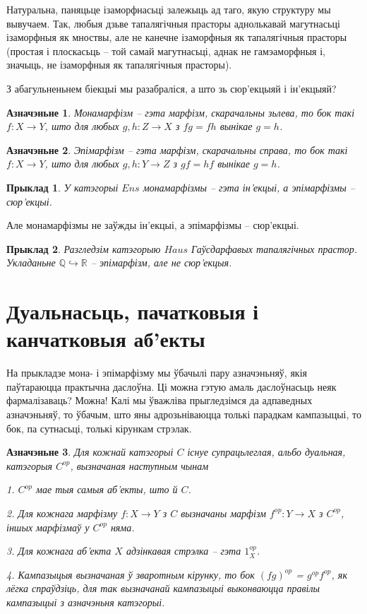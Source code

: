 \documentclass[a4paper,12pt]{book}
\newtheorem{example}{Прыклад}[section]
\newtheorem{definition}{Азначэньне}[section]
\begin{document}
Натуральна, паняцьце ізаморфнасьці залежыць ад таго, якую структуру мы
вывучаем. Так, любыя дзьве тапалягічныя прасторы аднолькавай
магутнасьці ізаморфныя як мноствы, але не канечне ізаморфныя як
тапалягічныя прасторы (простая і плоскасьць -- той самай магутнасьці,
аднак не гамэаморфныя і, значыць, не ізаморфныя як тапалягічныя прасторы).

З абагульненьнем біекцыі мы разабраліся, а што зь сюр'екцыяй і
ін'екцыяй?

\begin{definition}
  Монамарфізм -- гэта марфізм, скарачальны зьлева, то бок такі $f: X
  \rightarrow Y$, што для любых $g, h: Z \rightarrow X$ з $fg = fh$
  вынікае $g = h$.
\end{definition}

\begin{definition}
  Эпімарфізм -- гэта марфізм, скарачальны справа, то бок такі $f: X
  \rightarrow Y$, што для любых $g, h: Y \rightarrow Z$ з $gf = hf$
  вынікае $g = h$.
\end{definition}

\begin{example}
  У катэгорыі $Ens$ монамарфізмы -- гэта ін'екцыі, а эпімарфізмы --
  сюр'екцыі.
\end{example}

Але монамарфізмы не заўжды ін'екцыі, а эпімарфізмы -- сюр'екцыі.

\begin{example}
  Разгледзім катэгорыю $Haus$ Гаўсдарфавых тапалягічных
  прастор. Укладаньне $\mathbb{Q} \hookrightarrow \mathbb{R}$ --
  эпімарфізм, але не сюр'екцыя.
\end{example}

\section{Дуальнасьць, пачатковыя і канчатковыя аб'екты}

На прыкладзе мона- і эпімарфізму мы ўбачылі пару азначэньняў, якія
паўтараюцца практычна даслоўна. Ці можна гэтую амаль даслоўнасьць неяк
фармалізаваць? Можна! Калі мы ўважліва прыгледзімся да адпаведных
азначэньняў, то ўбачым, што яны адрозьніваюцца толькі парадкам
кампазыцыі, то бок, па сутнасьці, толькі кірункам стрэлак.

\begin{definition}
  Для кожнай катэгорыі $C$ існуе супрацьлеглая, альбо дуальная,
  катэгорыя $C^{op}$, вызначаная наступным чынам

  1. $C^{op}$ мае тыя самыя аб'екты, што й $C$.

  2. Для кожнага марфізму $f: X \rightarrow Y$ з $C$ вызначаны марфізм
  $f^{op}: Y \rightarrow X$ з $C^{op}$, іншых марфізмаў у $C^{op}$ няма.

  3. Для кожнага аб'екта $X$ адзінкавая стрэлка -- гэта $1_X^{op}$.

  4. Кампазыцыя вызначаная ў зваротным кірунку, то бок $(fg)^{op}$ =
  $g^{op}f^{op}$, як лёгка спраўдзіць, для так вызначанай кампазыцыі
  выконваюцца правілы кампазыцыі з азначэньня катэгорыі.
\end{definition}
\end{document}
